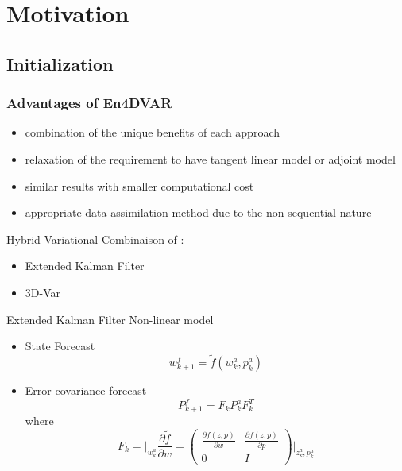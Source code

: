 \documentclass{beamer}
\begin{document}
\section{Motivation}
\subsection{Initialization}
\begin{frame}
	\frametitle{Advantages of En4DVAR}
	
	\begin{itemize}
		
		\item combination of the unique benefits of each approach 
		\item relaxation of the requirement to have tangent linear model or adjoint model
		\item similar results with smaller computational cost
		\item appropriate data assimilation method due to the non-sequential nature
		
	\end{itemize}
\end{frame}


\begin{frame}{Hybrid Variational}
    Combinaison of :
    \begin{itemize}
        \item  Extended Kalman Filter 
        \item  3D-Var
    \end{itemize}
\end{frame}
\begin{frame}{Extended Kalman Filter}
Non-linear model
    \begin{itemize}
        \item State Forecast 
        \begin{equation}
            w_{k+1}^f = \tilde{f} (w_k^a, p_k^a)
            \label{EKFfor}
            \end{equation}
        \item  Error covariance forecast
        \begin{equation}
        P_{k+1}^f = F_k P_k^a F_k^T
        \label{CovEKF}
        \end{equation}
    where 
            \begin{equation}
            F_k = \big|_{w_k^a} \frac{\partial \tilde{f} }{ \partial w } = 
            \begin{pmatrix}
            \frac{\partial f(z,p)}{\partial w } & \frac{\partial f(z,p)}{ \partial p}\\
            0 & I 
            \end{pmatrix}  \big|_{{z_k^a},{ p_k^a}}
            \label{EKFF}
            \end{equation}
    \end{itemize}
\end{frame}
\end{document}

